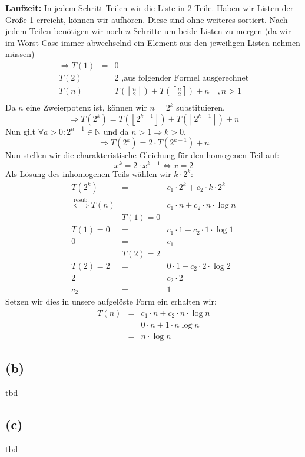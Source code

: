 \documentclass[11pt,a4paper,ngerman]{article}
\begin{document}
\begin{description}
\begin{description}
\item{\bfseries Laufzeit:} In jedem Schritt Teilen wir die Liste in 2 Teile. Haben wir Listen der Größe 1 erreicht, können wir aufhören. Diese sind ohne weiteres sortiert. Nach jedem Teilen benötigen wir noch $n$ Schritte um beide Listen zu mergen (da wir im Worst-Case immer abwechselnd ein Element aus den jeweiligen Listen nehmen müssen)
$$
\begin{array}{rcl}
\Rightarrow T(1) &=& 0  \\
T(2) &=& 2 \text{ ,aus folgender Formel ausgerechnet}\\
T(n) &=& T(\left\lfloor \frac{n}{2} \right\rfloor)+ T(\left\lceil \frac{n}{2} \right\rceil) + n  \quad , n>1\\
\end{array}
$$
Da $n$ eine Zweierpotenz ist, können wir $n = 2^k$ substituieren.
$$\Rightarrow T(2^k) = T(\left\lfloor 2^{k-1} \right\rfloor)+ T(\left\lceil 2^{k-1} \right\rceil) + n$$
Nun gilt $\forall a > 0 : 2^{n-1} \in \mathbb{N} $ und da $n>1 \Rightarrow k>0$.
$$\Rightarrow T(2^k) = 2\cdot T(2^{k-1}) + n$$
Nun stellen wir die charakteristische Gleichung für den homogenen Teil auf:
$$x^k = 2\cdot x^{k-1} \Leftrightarrow x = 2$$
Als Lösung des inhomogenen Teils wählen wir $k \cdot 2^k$:
$$
\begin{array}{rcl}
T(2^k) &=& c_1 \cdot 2^k + c_2 \cdot k \cdot 2^k\\
\stackrel{\text{resub.}}{\Leftrightarrow} T(n) &=& c_1 \cdot n + c_2 \cdot n \cdot \log n\\
&T(1) = 0&\\
T(1) = 0 &=& c_1 \cdot 1 + c_2 \cdot 1 \cdot \log 1\\
0&=&c_1\\
&T(2) = 2&\\
T(2) = 2 &=& 0 \cdot 1 + c_2 \cdot 2 \cdot \log 2\\
2&=&c_2 \cdot 2\\
c_2 &=& 1 
\end{array}
$$
Setzen wir dies in unsere aufgelöste Form ein erhalten wir:
$$
\begin{array}{rcl}
T(n) &=& c_1 \cdot n + c_2 \cdot n \cdot \log n\\ &=& 0 \cdot n + 1 \cdot n \log n \\ &=& n \cdot \log n
\end{array}
$$

\end{description}

\end{description}

\subsection*{(b)}

tbd

\subsection*{(c)}

tbd

\label{LastPage}
\end{document}
